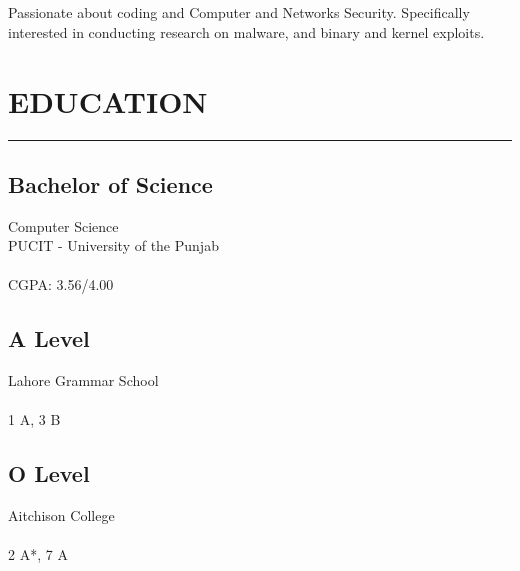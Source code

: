 \documentclass[]{resume}
\begin{document}
%
%

\begin{minipage}[t]{0.33\textwidth}

    \begin{large}
        \\
    \end{large}

    \vspace{4pt}
    \noindent {}\\
    Passionate about coding and Computer and Networks Security. Specifically interested in conducting research on malware, and binary and kernel exploits.



    \section{EDUCATION}
    \noindent\rule{5 cm}{0.4pt}

    \subsection{Bachelor of Science}
    \noindent Computer Science\\
    PUCIT - University of the Punjab\\
    \\
    CGPA: 3.56/4.00

    \vspace{8pt}
    \subsection{A Level}
    \noindent Lahore Grammar School\\
    \\
    1 A, 3 B

    \vspace{8pt}
    \subsection{O Level}
    \noindent Aitchison College\\
    \\
    2 A*, 7 A


\end{minipage}
\end{document}
